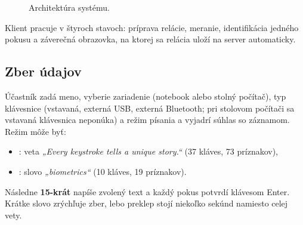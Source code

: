 \begin{figure}[H]
  \centering
  \vspace{1.5em}   %
  \caption{Architektúra systému.}
  \label{fig:arch}
\end{figure}

Klient pracuje v štyroch stavoch: príprava relácie, meranie, identifikácia
jedného pokusu a záverečná obrazovka, na ktorej sa relácia uloží na server
automaticky.

\subsection{Zber údajov}

Účastník zadá meno, vyberie zariadenie (notebook alebo stolný počítač),
typ klávesnice (vstavaná, externá USB, externá Bluetooth; pri stolovom
počítači sa vstavaná klávesnica neponúka) a režim písania a vyjadrí súhlas
so záznamom. Režim môže byť:
\begin{itemize}
  \item {}: veta \emph{„Every keystroke tells a unique story.“}
        (37 kláves, 73 príznakov),
  \item {}: slovo \emph{„biometrics“} (10 kláves, 19 príznakov).
\end{itemize}
Následne \textbf{15-krát} napíše zvolený text a každý pokus potvrdí klávesom
Enter. Krátke slovo zrýchľuje zber, lebo preklep stojí niekoľko sekúnd
namiesto celej vety.

